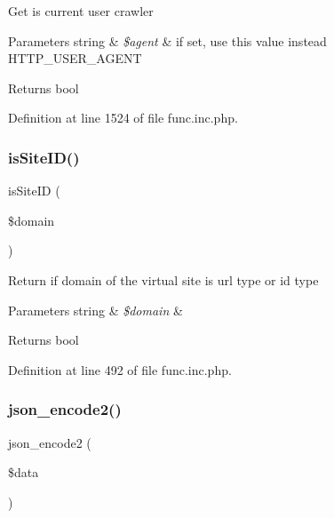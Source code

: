 Get is current user crawler


\begin{DoxyParams}[1]{Parameters}
string & {\em \$agent} & if set, use this value instead H\+T\+T\+P\+\_\+\+U\+S\+E\+R\+\_\+\+A\+G\+E\+NT \\
\hline
\end{DoxyParams}
\begin{DoxyReturn}{Returns}
bool 
\end{DoxyReturn}


Definition at line 1524 of file func.\+inc.\+php.

\mbox{\label{func_8inc_8php_aa85a46b82e60cc2c64682ea6464eeeff}} 
\subsubsection{\texorpdfstring{is\+Site\+I\+D()}{isSiteID()}}
{\footnotesize\ttfamily is\+Site\+ID (\begin{DoxyParamCaption}\item[{}]{\$domain }\end{DoxyParamCaption})}

Return if domain of the virtual site is url type or id type


\begin{DoxyParams}[1]{Parameters}
string & {\em \$domain} & \\
\hline
\end{DoxyParams}
\begin{DoxyReturn}{Returns}
bool 
\end{DoxyReturn}


Definition at line 492 of file func.\+inc.\+php.

\mbox{\label{func_8inc_8php_a3c49ddc63881e57fc5dd1aa4f923ef0c}} 
\subsubsection{\texorpdfstring{json\+\_\+encode2()}{json\_encode2()}}
{\footnotesize\ttfamily json\+\_\+encode2 (\begin{DoxyParamCaption}\item[{}]{\$data }\end{DoxyParamCaption})}

